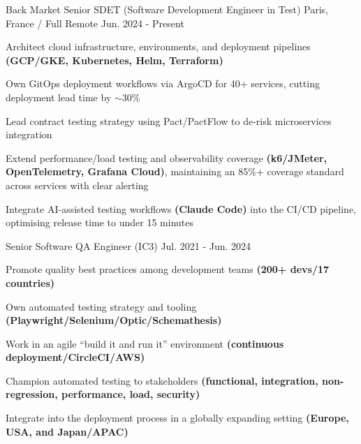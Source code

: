 
\begin{cventries}

  \cventry
  {Back Market }
  {Senior SDET (Software Development Engineer in Test)}
  {Paris, France / Full Remote}
  {Jun. 2024 - Present}
  {
    \begin{cvitems}
      \item{Architect cloud infrastructure, environments, and deployment pipelines \textbf{(GCP/GKE, Kubernetes, Helm, Terraform)}}
      \item{Own GitOps deployment workflows via ArgoCD for 40+ services, cutting deployment lead time by $\sim$30\%}
      \item{Lead contract testing strategy using Pact/PactFlow to de-risk microservices integration}
      \item{Extend performance/load testing and observability coverage \textbf{(k6/JMeter, OpenTelemetry, Grafana Cloud)}, maintaining an 85\%+ coverage standard across services with clear alerting}
      \item{Integrate AI-assisted testing workflows \textbf{(Claude Code)} into the CI/CD pipeline, optimising release time to under 15 minutes}
    \end{cvitems}
    \vspace{0.75em}
  }

  \cventry
  {}
  {Senior Software QA Engineer (IC3)}
  {}
  {Jul. 2021 - Jun. 2024}
  {
    \begin{cvitems}
      \item{Promote quality best practices among development teams \textbf{(200+ devs/17 countries)}}
      \item{Own automated testing strategy and tooling \textbf{(Playwright/Selenium/Optic/Schemathesis)}}
      \item{Work in an agile ``build it and run it'' environment \textbf{(continuous deployment/CircleCI/AWS)}}
      \item{Champion automated testing to stakeholders \textbf{(functional, integration, non-regression, performance, load, security)}}
      \item{Integrate into the deployment process in a globally expanding setting \textbf{(Europe, USA, and Japan/APAC)}}
    \end{cvitems}
    \vspace{0.75em}
  }


\end{cventries}
